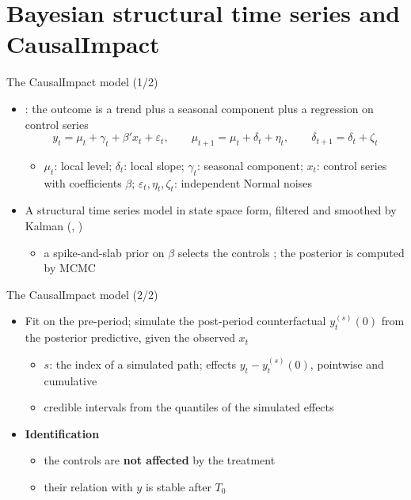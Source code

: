 \section{Bayesian structural time series and CausalImpact}

\begin{frame}{The CausalImpact model (1/2)}
\itemsize{\small}
\begin{itemize}
    \item {}: the outcome is a trend plus a seasonal component plus a regression on control series \[ y_t = \mu_t + \gamma_t + \beta'x_t + \varepsilon_t, \qquad \mu_{t+1} = \mu_t + \delta_t + \eta_t, \qquad \delta_{t+1} = \delta_t + \zeta_t \]
    \begin{itemize}
        \item $\mu_t$: local level; $\delta_t$: local slope; $\gamma_t$: seasonal component; $x_t$: control series with coefficients $\beta$; $\varepsilon_t, \eta_t, \zeta_t$: independent Normal noises
    \end{itemize}
    \item A structural time series model  in state space form, filtered and smoothed by Kalman (, )
    \begin{itemize}
        \item a spike-and-slab prior on $\beta$ selects the controls ; the posterior is computed by MCMC
    \end{itemize}
\end{itemize}
\end{frame}

\begin{frame}{The CausalImpact model (2/2)}
\itemsize{\small}
\begin{itemize}
    \item Fit on the pre-period; simulate the post-period counterfactual $y^{(s)}_t(0)$ from the posterior predictive, given the observed $x_t$
    \begin{itemize}
        \item $s$: the index of a simulated path; effects $y_t - y^{(s)}_t(0)$, pointwise and cumulative
        \item credible intervals from the quantiles of the simulated effects
    \end{itemize}
    \item \textbf{Identification}
    \begin{itemize}
        \item the controls are \textbf{not affected} by the treatment
        \item their relation with $y$ is stable after $T_0$
    \end{itemize}
\end{itemize}
\end{frame}

